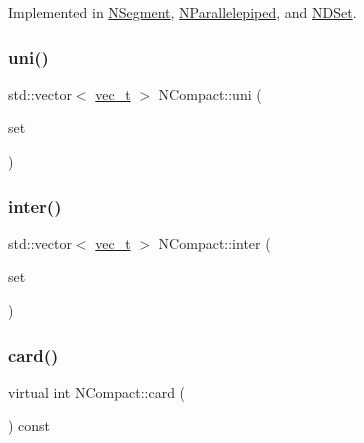 Implemented in \mbox{\hyperlink{class_n_segment_a9370351370e57d265f990b3e9d2ab114}{N\+Segment}}, \mbox{\hyperlink{class_n_parallelepiped_abe05e06f34b0be7d18c098ef7821edf3}{N\+Parallelepiped}}, and \mbox{\hyperlink{class_n_d_set_a0023b3999000c4d5ed05704d7346466d}{N\+D\+Set}}.

\mbox{\label{class_n_compact_a64fb223b2f03a10d80e1290f1947f026}} 
\subsubsection{\texorpdfstring{uni()}{uni()}}
{\footnotesize\ttfamily std\+::vector$<$ \mbox{\hyperlink{group___n_algebra_ga0a2cfc67e738a3d73e4f12098c4c07f6}{vec\+\_\+t}} $>$ N\+Compact\+::uni (\begin{DoxyParamCaption}\item[{const \mbox{\hyperlink{class_n_compact}{N\+Compact}} \&}]{set }\end{DoxyParamCaption})\hspace{0.3cm}{\ttfamily [virtual]}}

\mbox{\label{class_n_compact_a5806924822793fdd89f4168e1e8c4d3c}} 
\subsubsection{\texorpdfstring{inter()}{inter()}}
{\footnotesize\ttfamily std\+::vector$<$ \mbox{\hyperlink{group___n_algebra_ga0a2cfc67e738a3d73e4f12098c4c07f6}{vec\+\_\+t}} $>$ N\+Compact\+::inter (\begin{DoxyParamCaption}\item[{const \mbox{\hyperlink{class_n_compact}{N\+Compact}} \&}]{set }\end{DoxyParamCaption})\hspace{0.3cm}{\ttfamily [virtual]}}

\mbox{\label{class_n_compact_a816bb4976567a7bfed57763ce717b685}} 
\subsubsection{\texorpdfstring{card()}{card()}}
{\footnotesize\ttfamily virtual int N\+Compact\+::card (\begin{DoxyParamCaption}{ }\end{DoxyParamCaption}) const\hspace{0.3cm}{\ttfamily [pure virtual]}}



